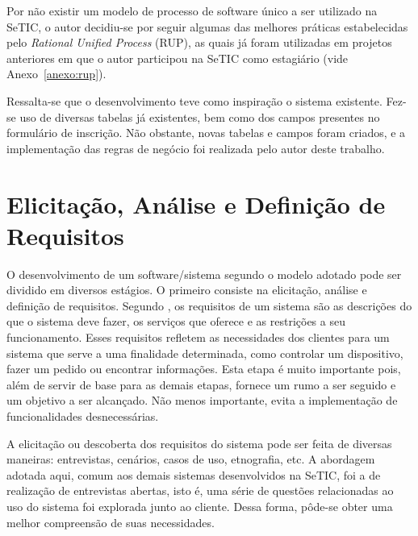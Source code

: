 \documentclass[
  10.5pt,				  %
	openright,			%
	twoside,			  %
  a5paper,
  chapter=TITLE,	%
	section=TITLE,	%
  hyphens,        %
	english,        %
	brazil          %
]{abntex2}
\begin{document}
Por não existir um modelo de processo de software único a ser utilizado na SeTIC, o autor decidiu-se por seguir algumas das melhores práticas estabelecidas pelo \emph{Rational Unified Process} (RUP), as quais já foram utilizadas em projetos anteriores em que o autor participou na SeTIC como estagiário (vide Anexo~\ref{anexo:rup}).


Ressalta-se que o desenvolvimento teve como inspiração o sistema existente. Fez-se uso de diversas tabelas já existentes, bem como dos campos presentes no formulário de inscrição. Não obstante, novas tabelas e campos foram criados, e a implementação das regras de negócio foi realizada pelo autor deste trabalho.


\section{Elicitação, Análise e Definição de Requisitos}

O desenvolvimento de um software/sistema segundo o modelo adotado pode ser dividido em diversos estágios. O primeiro consiste na elicitação, análise e definição de requisitos. Segundo , os requisitos de um sistema são as descrições do que o sistema deve fazer, os serviços que oferece e as restrições a seu funcionamento. Esses requisitos refletem as necessidades dos clientes para um sistema que serve a uma finalidade determinada, como controlar um dispositivo, fazer um pedido ou encontrar informações. Esta etapa é muito importante pois, além de servir de base para as demais etapas, fornece um rumo a ser seguido e um objetivo a ser alcançado. Não menos importante, evita a implementação de funcionalidades desnecessárias.

A elicitação ou descoberta dos requisitos do sistema pode ser feita de diversas maneiras: entrevistas, cenários, casos de uso, etnografia, etc. A abordagem adotada aqui, comum aos demais sistemas desenvolvidos na SeTIC, foi a de realização de entrevistas abertas, isto é, uma série de questões relacionadas ao uso do sistema foi explorada junto ao cliente. Dessa forma, pôde-se obter uma melhor compreensão de suas necessidades.
\end{document}
